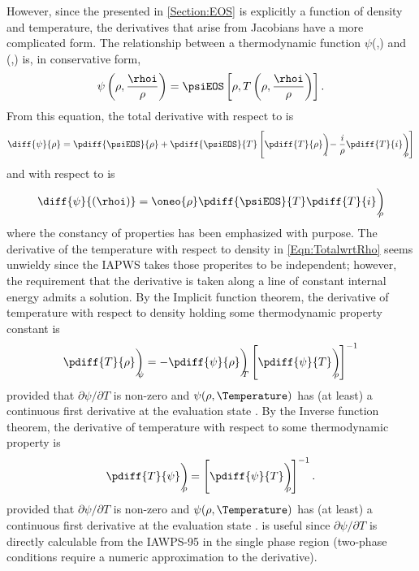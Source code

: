However, since the \EOS presented in \cref{Section:EOS} is explicitly a function of density and temperature, the derivatives that arise from Jacobians have a more complicated form.
The relationship between a thermodynamic function $\psi$(\rho,\IntEnergy) and \psiEOS(\rho,\Temperature) is, in conservative form,
\begin{equation}
    \psi\left(\rho,\frac{\rhoi}{\rho}\right) = \psiEOS\left[\rho,T\left(\rho,\frac{\rhoi}{\rho}\right)\right].
\label{Eqn:PressureFunctionRelation}
\end{equation}
From this equation, the total derivative with respect to \rho is
\begin{equation}
    \diff{\psi}{\rho} = \pdiff{\psiEOS}{\rho} + 
                        \pdiff{\psiEOS}{T}    
                        \left[\pdiff{T}{\rho}\biggr)_{\!\!\!\! i} - \frac{i}{\rho}\pdiff{T}{i}\biggr)_{\!\!\!\!    \rho}\right]
    \label{Eqn:TotalwrtRho}
\end{equation}
and  with respect to \rhoi is
\begin{equation}
    \diff{\psi}{(\rhoi)} = \oneo{\rho}\pdiff{\psiEOS}{T} \pdiff{T}{i}\biggr)_{\!\!\!\!    \rho}
    \label{Eqn:TotalwrtRhoi}
\end{equation}
where the constancy of properties has been emphasized with purpose.
The derivative of the temperature with respect to density in \cref{Eqn:TotalwrtRho} seems unwieldy since the IAPWS takes those properites to be independent; however, the requirement that the derivative is taken along a line of constant internal energy admits a solution.
By the Implicit function theorem, the derivative of temperature with respect to density holding some thermodynamic property \psi constant is
\begin{equation}
    \pdiff{T}{\rho}\biggr)_{\!\!\!\! \psi} = - \pdiff{\psi}{\rho}\biggr)_{\!\!\!\! T} \left[\pdiff{\psi}{T}\biggr)_{\!\!\!\! \rho} \right]^{-1}
    \label{Eqn:dTdrho}
\end{equation}
provided that $\partial\psi/\partial{T}$ is non-zero and $\psi(\rho,\Temperature)$ has (at least) a continuous first derivative at the evaluation state \cite{greenberg_advanced_1998}.
By the Inverse function theorem, the derivative of temperature with respect to some thermodynamic property \psi is
\begin{equation}
    \pdiff{T}{\psi}\biggr)_{\!\!\!\!    \rho} = \left[\pdiff{\psi}{T}\biggr)_{\!\!\!\!    \rho} \right]^{-1}.
    \label{Eqn:dTdi}
\end{equation}
provided that $\partial\psi/\partial{T}$ is non-zero and $\psi(\rho,\Temperature)$ has (at least) a continuous first derivative at the evaluation state \cite{greenberg_advanced_1998}.
 is useful since $\partial\psi/\partial{T}$ is directly calculable from the IAWPS-95 \EOS in the single phase region (two-phase conditions require a numeric approximation to the derivative).

